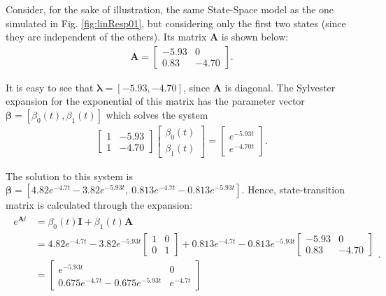 \documentclass[a4paper,11pt]{book}
\numberwithin{figure}{chapter}
\numberwithin{equation}{chapter}
\numberwithin{table}{chapter}
\theoremstyle{definition}
\newtheorem{example}{Example}[chapter]
\newcounter{boxed-theorem}
\newcounter{boxed-lemma}
\newcounter{boxed-definition}
\newcounter{boxed-example}
\newenvironment{boxed-example}[1]
{\colorlet{shadecolor}{pastelRed!15} \begin{shaded} \begin{example}{#1}}
{\end{example} \end{shaded}}
\begin{document}
\begin{boxed-example}{} \label{ex:stateTrans}
	Consider, for the sake of illustration, the same State-Space model as the one simulated in Fig. \ref{fig:linResp01}, but considering only the first two states (since they are independent of the others). Its matrix $\bm{A}$ is shown below:
	\begin{align} \label{eq:stateRespEx01}
	    \bm{A} = \begin{bmatrix} 
	        -5.93  &        0 \\
	        0.83   &  -4.70 
	    \end{bmatrix}
	.\end{align}
	
\noindent It is easy to see that $\bm{\lambda} = [-5.93, -4.70]$, since $\bm{A}$ is diagonal. The Sylvester expansion for the exponential of this matrix has the parameter vector $\bm{\beta} = [\beta_0(t), \beta_1(t)]$ which solves the system
	\begin{align}
	\begin{bmatrix}
		1 & -5.93 \\ 1 & -4.70
	\end{bmatrix} \begin{bmatrix}
		\beta_0(t) \\ \beta_1(t)
	\end{bmatrix} = \begin{bmatrix}
		e^{-5.93 t} \\ e^{-4.70 t}
	\end{bmatrix}
	.\end{align}
	
	\noindent The solution to this system is $\bm{\beta} = [4.82e^{-4.7t}-3.82e^{-5.93t},\ 0.813e^{-4.7t} - 0.813e^{-5.93t}]$. Hence, state-transition matrix is calculated through the expansion:
	\begin{align}
	\begin{split}
		e^{\bm{A} t} & = \beta_0(t) \bm{I} + \beta_1(t) \bm{A} \\ & = 4.82e^{-4.7t}-3.82e^{-5.93t} \begin{bmatrix} 1 & 0 \\ 0 & 1 \end{bmatrix} + 0.813e^{-4.7t}-0.813e^{-5.93t} \begin{bmatrix} -5.93  & 0 \\ 0.83  & -4.70 \end{bmatrix} \\
		& =  \begin{bmatrix} e^{-5.93t} & 0 \\ 0.675e^{-4.7t} - 0.675e^{-5.93t} & e^{-4.7t} \end{bmatrix} \\
	\end{split}
	.\end{align}
\end{boxed-example}
\end{document}
